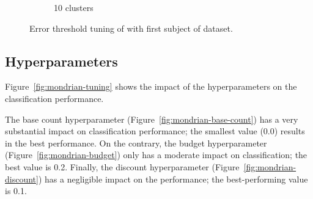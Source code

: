 \begin{figure}
\begin{subfigure}[b]{0.49\textwidth}
		 \caption{10 clusters}
	 \end{subfigure}
	\caption{Error threshold tuning of \mcnn with first subject of \banosdataset dataset.}
	\label{fig:mcnn-tuning-error}
\end{figure}

\subsection{\mondrianforest Hyperparameters}

Figure~\ref{fig:mondrian-tuning} shows the impact of the \mondrianforest hyperparameters on
the classification performance. 

The base count hyperparameter (Figure~\ref{fig:mondrian-base-count}) has a
very substantial impact on classification performance; the smallest value
(0.0) results in the best performance. On the contrary, the
budget hyperparameter (Figure~\ref{fig:mondrian-budget}) only has a
moderate impact on classification; the best value is 0.2. Finally, the discount hyperparameter
(Figure~\ref{fig:mondrian-discount}) has a negligible impact on the
performance; the best-performing value is 0.1.


